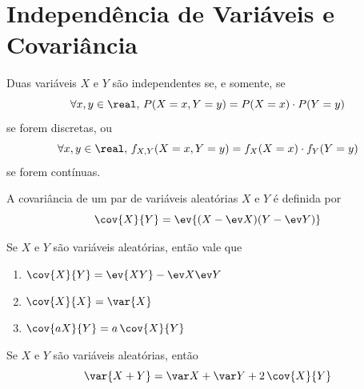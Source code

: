 \section{Independência de Variáveis e Covariância}

\begin{def:independencia de variaveis}
Duas variáveis $X$ e $Y$ são independentes se, e somente, se
\[
    \forall x, y \in \real,\, P(X = x, Y = y) = P(X = x) \cdot P(Y = y)
\]
se forem discretas, ou
\[
    \forall x, y \in \real,\, f_{X, Y}(X = x, Y = y) = f_X(X = x) \cdot f_Y(Y = y)
\]
se forem contínuas.
\end{def:independencia de variaveis}

\begin{def:covariancia}
A covariância de um par de variáveis aleatórias $X$ e $Y$ é definida por
\[
    \cov{X}{Y} = \ev{(X - \ev X)(Y - \ev Y)}
\]
\end{def:covariancia}

\begin{thm:propriedades covariancia}
\label{thm:propriedades covariancia}
Se $X$ e $Y$ são variáveis aleatórias, então vale que
\begin{enumerate}
\item $\cov{X}{Y} = \ev{XY} - \ev X \ev Y $
\item $\cov{X}{X} = \var{X}$
\item $\cov{aX}{Y} = a \, \cov{X}{Y}$
\end{enumerate}
\end{thm:propriedades covariancia}

\begin{prop:variancia da soma}
\label{prop:variancia da soma}
Se $X$ e $Y$ são variáveis aleatórias, então
\[
    \var{X + Y} = \var X + \var Y + 2\, \cov{X}{Y}
\]
\end{prop:variancia da soma}

